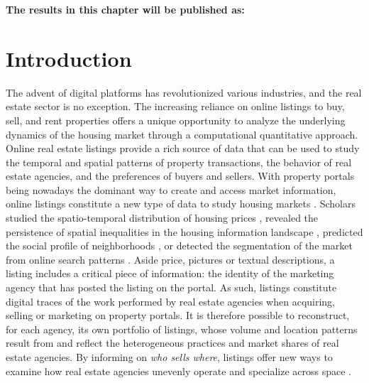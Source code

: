 \vspace{-1.5cm}
\small
\textbf{The results in this chapter will be published as:}
\vspace{0.05 cm}

\normalsize
\vspace{0.5 cm}

\section{Introduction}

The advent of digital platforms has revolutionized various industries, and the real estate sector is no exception. The increasing reliance on online listings to buy, sell, and rent properties offers a unique opportunity to analyze the underlying dynamics of the housing market through a computational quantitative approach. Online real estate listings provide a rich source of data that can be used to study the temporal and spatial patterns of property transactions, the behavior of real estate agencies, and the preferences of buyers and sellers. With property portals being nowadays the dominant way to create and access market information, online listings constitute a new type of data to study housing markets \cite{sawyer1999ict, boeing2017new, boulay2021moving}. Scholars studied the spatio-temporal distribution of housing prices \cite{yao2018mapping,adolfsen_segmentation_2022}, revealed the persistence of spatial inequalities in the housing information landscape \cite{boeing2020online}, predicted the social profile of neighborhoods \cite{delmelle2021language}, or detected the segmentation of the market from online search patterns \cite{rae2015online}.
Aside price, pictures or textual descriptions, a listing includes a critical piece of information: the identity of the marketing agency that has posted the listing on the portal. As such, listings constitute digital traces \cite{salganikbit2017} of the work performed by real estate agencies when acquiring, selling or marketing on property portals. It is therefore possible to reconstruct, for each agency, its own portfolio of listings, whose volume and location patterns result from and reflect the heterogeneous practices and market shares of real estate agencies. By informing on \textit{who sells where}, listings offer new ways to examine how real estate agencies unevenly operate and specialize across space \cite{palm1976RealEstate}.

